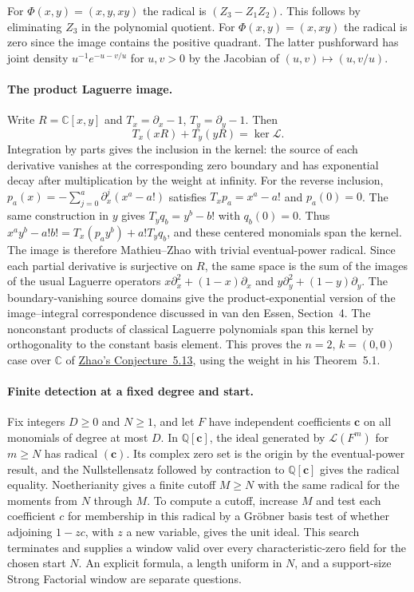 \documentclass[11pt]{article}
\newcommand{\Lfac}{\mathcal L}
\newcommand{\C}{\mathbb C}
\newcommand{\Q}{\mathbb Q}
\begin{document}
For $\Phi(x,y)=(x,y,xy)$ the radical is $(Z_3-Z_1Z_2)$. This follows by
eliminating $Z_3$ in the polynomial quotient. For $\Phi(x,y)=(x,xy)$
the radical is zero since the image contains the positive quadrant.
The latter pushforward has joint density $u^{-1}e^{-u-v/u}$ for $u,v>0$
by the Jacobian of $(u,v)\mapsto(u,v/u)$.

\paragraph{The product Laguerre image.}
Write $R=\C[x,y]$ and $T_x=\partial_x-1$, $T_y=\partial_y-1$. Then
\[
 T_x(xR)+T_y(yR)=\ker\Lfac.
\]
Integration by parts gives the inclusion in the kernel: the source of
each derivative vanishes at the corresponding zero boundary and has
exponential decay after multiplication by the weight at infinity.
For the reverse inclusion, $p_a(x)=-\sum_{j=0}^a\partial_x^j(x^a-a!)$
satisfies $T_xp_a=x^a-a!$ and $p_a(0)=0$. The same construction in $y$
gives $T_yq_b=y^b-b!$ with $q_b(0)=0$. Thus
$x^ay^b-a!b!=T_x(p_a y^b)+a!T_yq_b$, and these centered monomials span
the kernel. The image is therefore Mathieu--Zhao with trivial
eventual-power radical. Since each partial derivative is surjective on
$R$, the same space is the sum of the images of the usual Laguerre
operators $x\partial_x^2+(1-x)\partial_x$ and
$y\partial_y^2+(1-y)\partial_y$. The boundary-vanishing source domains
give the product-exponential version of the image--integral
correspondence discussed in van den Essen, Section~4.
The nonconstant products of classical Laguerre polynomials span this
kernel by orthogonality to the constant basis element. This proves the
$n=2$, $k=(0,0)$ case over $\C$ of
\href{https://arxiv.org/abs/0907.3990v2}{Zhao's Conjecture~5.13},
using the weight in his Theorem~5.1.

\paragraph{Finite detection at a fixed degree and start.}
Fix integers $D\geq 0$ and $N\geq 1$, and let $F$ have independent
coefficients $\mathbf c$ on all monomials of degree at most $D$.
In $\Q[\mathbf c]$, the ideal generated by $\Lfac(F^m)$ for $m\geq N$
has radical $(\mathbf c)$. Its complex zero set is the origin by the
eventual-power result, and the Nullstellensatz followed by contraction
to $\Q[\mathbf c]$ gives the radical equality. Noetherianity gives a
finite cutoff $M\geq N$ with the same radical for the moments from $N$
through $M$. To compute a cutoff, increase $M$ and test each coefficient
$c$ for membership in this radical by a Gr\"obner basis test of whether
adjoining $1-zc$, with $z$ a new variable, gives the unit ideal. This
search terminates and supplies a window valid over every
characteristic-zero field for the chosen start $N$. An explicit formula,
a length uniform in $N$, and a support-size Strong Factorial window are
separate questions.
\end{document}
